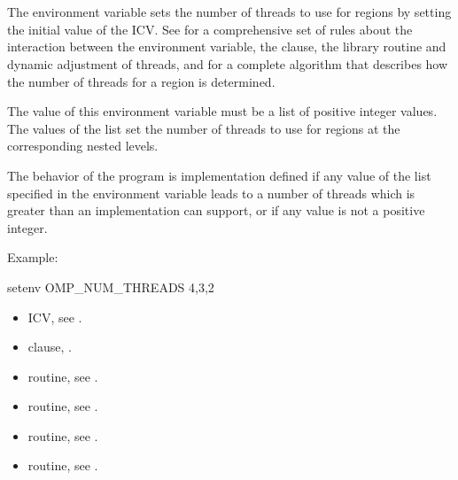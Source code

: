 \section{}
\label{sec:OMP_NUM_THREADS}
The  environment variable sets the number of threads to use for 
 regions by setting the initial value of the  ICV. See 
 for a comprehensive set of rules about the interaction between the 
 environment variable, the  clause, the 
 library routine and dynamic adjustment of threads, and 
for a complete algorithm that describes how the number of 
threads for a  region is determined.

The value of this environment variable must be a list of positive integer values. The 
values of the list set the number of threads to use for  regions at the 
corresponding nested levels.

The behavior of the program is implementation defined if any value of the list specified 
in the  environment variable leads to a number of threads which is 
greater than an implementation can support, or if any value is not a positive integer.

Example:
\begin{boxedcode}
setenv OMP\_NUM\_THREADS 4,3,2
\end{boxedcode}

\crossreferences
\begin{itemize}
\item {} ICV, see .

\item {} clause, .

\item {} routine, see .

\item {} routine, see .

\item {} routine, see .

\item {} routine, see .
\end{itemize}







